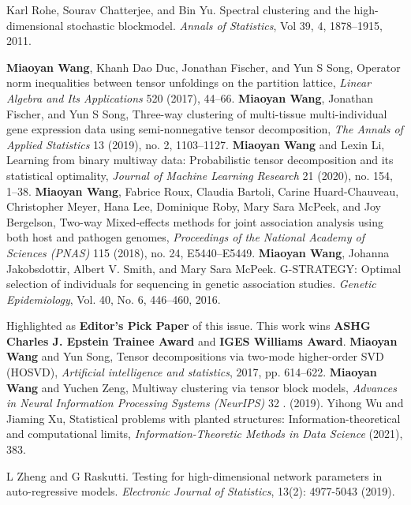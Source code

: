 \documentclass[10pt]{article}
\theoremstyle{plain}
\theoremstyle{definition}
\begin{document}
{\begin{thebibliography}{9}
Karl Rohe, Sourav Chatterjee, and Bin Yu. Spectral clustering and the high-dimensional stochastic blockmodel.  \emph{Annals of Statistics}, Vol 39, 4, 1878--1915, 2011. 

{\bf Miaoyan Wang}, Khanh Dao Duc, Jonathan Fischer, and Yun S Song, Operator norm inequalities between tensor unfoldings on the partition lattice, \emph{Linear Algebra and Its Applications} 520 (2017), 44–66.
{\bf Miaoyan Wang}, Jonathan Fischer, and Yun S Song, Three-way clustering of multi-tissue multi-individual gene expression data using semi-nonnegative tensor decomposition, \emph{The Annals of Applied Statistics} 13 (2019), no. 2, 1103–1127.
{\bf Miaoyan Wang} and Lexin Li, Learning from binary multiway data: Probabilistic tensor decomposition and its statistical optimality, \emph{Journal of Machine Learning Research} 21 (2020), no. 154, 1–38.
{\bf Miaoyan Wang}, Fabrice Roux, Claudia Bartoli, Carine Huard-Chauveau, Christopher Meyer, Hana Lee, Dominique Roby, Mary Sara McPeek, and Joy Bergelson, Two-way Mixed-effects methods for joint association analysis using both host and pathogen genomes, \emph{Proceedings of the National Academy of Sciences (PNAS)} 115 (2018), no. 24, E5440–E5449.
{\bf Miaoyan Wang}, Johanna Jakobsdottir, Albert V. Smith, and Mary Sara McPeek. G-STRATEGY: Optimal selection of individuals for sequencing in genetic association studies. \emph{Genetic Epidemiology}, Vol. 40, No. 6, 446–460, 2016.

Highlighted as {\bf Editor's Pick Paper} of this issue. This work wins {\bf  ASHG Charles J. Epstein Trainee Award} and {\bf  IGES Williams Award}. 
{\bf Miaoyan Wang} and Yun Song, Tensor decompositions via two-mode higher-order SVD (HOSVD), \emph{Artificial intelligence and statistics}, 2017, pp. 614–622.
{\bf Miaoyan Wang} and Yuchen Zeng, Multiway clustering via tensor block models, \emph{ Advances in Neural Information Processing Systems (NeurIPS)} 32 . (2019).
Yihong Wu and Jiaming Xu, Statistical problems with planted structures: Information-theoretical and computational limits, \emph{Information-Theoretic Methods in Data Science} (2021), 383.

L Zheng and G Raskutti. Testing for high-dimensional network parameters in auto-regressive models. \emph{Electronic Journal of Statistics}, 13(2): 4977-5043 (2019). 

\end{thebibliography}
}

%
%
\end{document}
